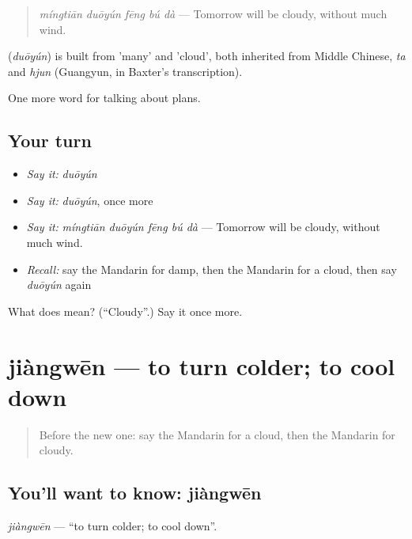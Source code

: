 \begin{quote}
\textbf{} \emph{míngtiān duōyún fēng bú dà} — Tomorrow will be cloudy, without much wind.
\end{quote}

\begin{cousinweb}
\textbf{} (\emph{duōyún}) is built from  'many' and  'cloud', both inherited from Middle Chinese, \emph{ta} and \emph{hjun} (Guangyun, in Baxter's transcription).
\end{cousinweb}

\begin{grammarlens}[title={What you've built}]
One more word for talking about plans.
\end{grammarlens}

\subsection*{Your turn}
\begin{itemize}
\raggedright
  \item \emph{Say it:} \emph{duōyún}
  \item \emph{Say it:} \emph{duōyún}, once more
  \item \emph{Say it:} \emph{míngtiān duōyún fēng bú dà} — Tomorrow will be cloudy, without much wind.
  \item \emph{Recall:} say the Mandarin for damp, then the Mandarin for a cloud, then say \emph{duōyún} again
\end{itemize}

\begin{tcolorbox}[breakable,colback=teal!4,colframe=teal!35!black,title={Before you move on}]
What does  mean? (\textquotedblleft{}Cloudy\textquotedblright{}.) Say it once more.
\end{tcolorbox}
\section[jiàngwēn]{jiàngwēn — to turn colder; to cool down}

\label{lesson:ZH-C219-jiangwen}



\begin{quote}
Before the new one: say the Mandarin for a cloud, then the Mandarin for cloudy.
\end{quote}

\subsection*{You'll want to know: jiàngwēn}
\emph{jiàngwēn} — \textquotedblleft{}to turn colder; to cool down\textquotedblright{}.

